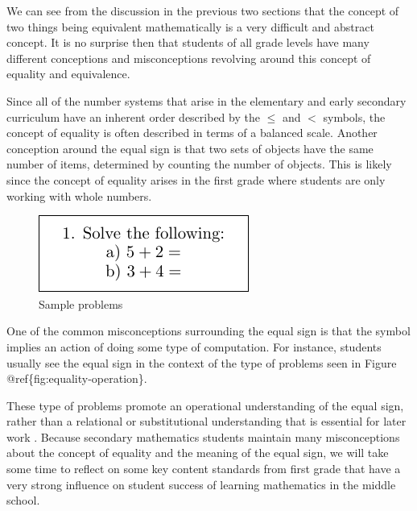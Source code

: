 \documentclass[
]{book}
\theoremstyle{definition}
\theoremstyle{definition}
\theoremstyle{definition}
\theoremstyle{remark}
\begin{document}
We can see from the discussion in the previous two sections that the concept of two things being equivalent mathematically is a very difficult and abstract concept. It is no surprise then that students of all grade levels have many different conceptions and misconceptions revolving around this concept of equality and equivalence.

Since all of the number systems that arise in the elementary and early secondary curriculum have an inherent order described by the \(\leq\) and \(<\) symbols, the concept of equality is often described in terms of a balanced scale. Another conception around the equal sign is that two sets of objects have the same number of items, determined by counting the number of objects. This is likely since the concept of equality arises in the first grade where students are only working with whole numbers.

\begin{figure}

{\centering \includegraphics[width=0.35\linewidth]{tikz/sample_addition_problem} 

}

\caption{Sample problems}\label{fig:equality-operation}
\end{figure}

One of the common misconceptions surrounding the equal sign is that the symbol implies an action of doing some type of computation. For instance, students usually see the equal sign in the context of the type of problems seen in Figure @ref\{fig:equality-operation\}.

These type of problems promote an operational understanding of the equal sign, rather than a relational or substitutional understanding that is essential for later work \citep[pp.~145-150]{Cognition}. Because secondary mathematics students maintain many misconceptions about the concept of equality and the meaning of the equal sign, we will take some time to reflect on some key content standards from first grade that have a very strong influence on student success of learning mathematics in the middle school.
\end{document}
